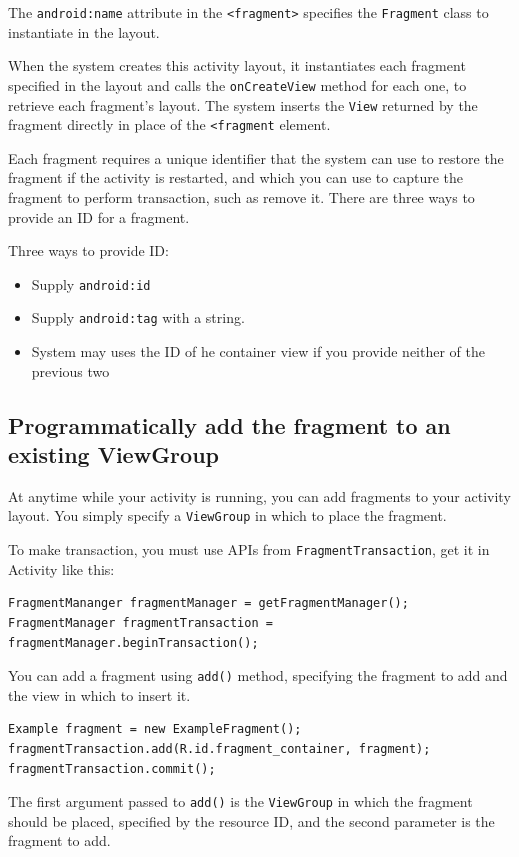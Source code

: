 \documentclass[11pt, a4paper]{book}
\begin{document}
The \verb|android:name| attribute in the \verb|<fragment>| specifies the
\verb|Fragment| class to instantiate in the layout.

When the system creates this activity layout, it instantiates each fragment
specified in the layout and calls the \verb|onCreateView| method for each one,
to retrieve each fragment's layout. The system inserts the \verb|View| returned
by the fragment directly in place of the \verb|<fragment| element.

Each fragment requires a unique identifier that the system can use to restore
the fragment if the activity is restarted, and which you can use to capture the
fragment to perform transaction, such as remove it. There are three ways to
provide an ID for a fragment.

Three ways to provide ID:
\begin{itemize}
    \item Supply \verb|android:id|
    \item Supply \verb|android:tag| with a string.
    \item System may uses the ID of he container view if you provide neither of the
        previous two
\end{itemize}
\subsection{Programmatically add the fragment to an existing ViewGroup}
At anytime while your activity is running, you can add fragments to your
activity layout. You simply specify a \verb|ViewGroup| in which to place the
fragment.

To make transaction, you must use APIs from \verb|FragmentTransaction|, get it
in Activity like this:
\begin{verbatim}
FragmentMananger fragmentManager = getFragmentManager();
FragmentManager fragmentTransaction = fragmentManager.beginTransaction();
\end{verbatim}
You can add a fragment using \verb|add()| method, specifying the fragment to add
and the view in which to insert it.
\begin{verbatim}
Example fragment = new ExampleFragment();
fragmentTransaction.add(R.id.fragment_container, fragment);
fragmentTransaction.commit();
\end{verbatim}
The first argument passed to \verb|add()| is the \verb|ViewGroup| in which the
fragment should be placed, specified by the resource ID, and the second
parameter is the fragment to add.
\end{document}
